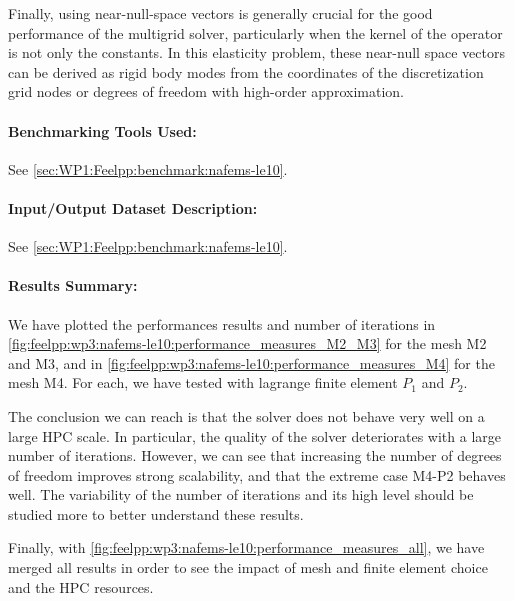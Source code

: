 Finally, using near-null-space vectors is generally crucial for the good
performance of the multigrid solver, particularly when the kernel of the
operator is not only the constants. In this elasticity problem, these near-null
space vectors can be derived as rigid body modes from the coordinates of the
discretization grid nodes or degrees of freedom with high-order approximation.


\paragraph{Benchmarking Tools Used:} %
See \cref{sec:WP1:Feelpp:benchmark:nafems-le10}.

\paragraph{Input/Output Dataset Description:}
See \cref{sec:WP1:Feelpp:benchmark:nafems-le10}.

\paragraph{Results Summary:} %

We have plotted the performances results and number of iterations in
\cref{fig:feelpp:wp3:nafems-le10:performance_measures_M2_M3} for the mesh M2 and
M3, and in
\cref{fig:feelpp:wp3:nafems-le10:performance_measures_M4} for the mesh M4. For
each, we have tested with lagrange finite element $P_1$ and $P_2$.

The conclusion we can reach is that the solver does not behave very well on a
large HPC scale. In particular, the quality of the solver deteriorates with a
large number of iterations. However, we can see that increasing the number of
degrees of freedom improves strong scalability, and that the extreme case M4-P2
behaves well. The variability of the number of iterations and its high level
should be studied more to better understand these results.

Finally, with
\cref{fig:feelpp:wp3:nafems-le10:performance_measures_all}, we have merged all
results in order to see the impact of mesh and finite element choice and the
HPC resources.

